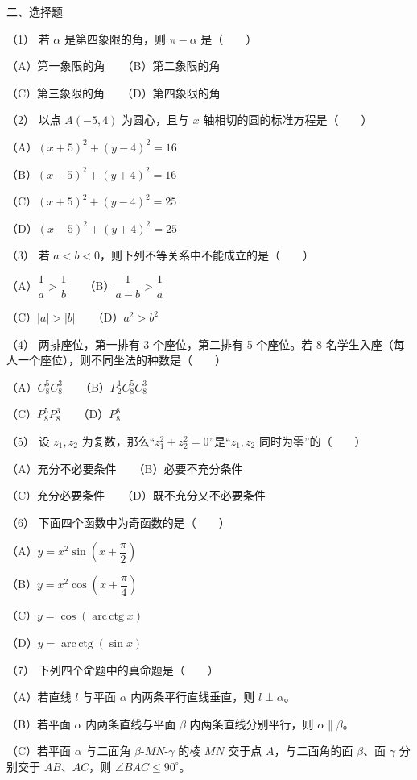\begin{question}

二、选择题

（1） 若 $\alpha$ 是第四象限的角，则 $\pi-\alpha$ 是\mbox{（　　）}

（A）第一象限的角　　（B）第二象限的角

（C）第三象限的角　　（D）第四象限的角

（2） 以点 $A(-5,4)$ 为圆心，且与 $x$ 轴相切的圆的标准方程是\mbox{（　　）}

（A）$(x+5)^2+(y-4)^2=16$

（B）$(x-5)^2+(y+4)^2=16$

（C）$(x+5)^2+(y-4)^2=25$

（D）$(x-5)^2+(y+4)^2=25$

（3） 若 $a<b<0$，则下列不等关系中不能成立的是\mbox{（　　）}

（A）$\dfrac1a>\dfrac1b$　　（B）$\dfrac1{a-b}>\dfrac1a$

（C）$|a|>|b|$　　（D）$a^2>b^2$

（4） 两排座位，第一排有 3 个座位，第二排有 5 个座位。若 8 名学生入座（每人一个座位），则不同坐法的种数是\mbox{（　　）}

（A）$C_8^5C_8^3$　　（B）$P_2^1C_8^5C_8^3$

（C）$P_8^5P_8^3$　　（D）$P_8^8$

（5） 设 $z_1,z_2$ 为复数，那么“$z_1^2+z_2^2=0$”是“$z_1,z_2$ 同时为零”的\mbox{（　　）}

（A）充分不必要条件　　（B）必要不充分条件

（C）充分必要条件　　（D）既不充分又不必要条件

（6） 下面四个函数中为奇函数的是\mbox{（　　）}

（A）$y=x^2\sin\left(x+\dfrac\pi2\right)$

（B）$y=x^2\cos\left(x+\dfrac\pi4\right)$

（C）$y=\cos(\operatorname{arc\,ctg}x)$

（D）$y=\operatorname{arc\,ctg}(\sin x)$

（7） 下列四个命题中的真命题是\mbox{（　　）}

（A）若直线 $l$ 与平面 $\alpha$ 内两条平行直线垂直，则 $l\perp\alpha$。

（B）若平面 $\alpha$ 内两条直线与平面 $\beta$ 内两条直线分别平行，则 $\alpha\parallel\beta$。

（C）若平面 $\alpha$ 与二面角 $\beta$-$MN$-$\gamma$ 的棱 $MN$ 交于点 $A$，与二面角的面 $\beta$、面 $\gamma$ 分别交于 $AB$、$AC$，则 $\angle BAC\le90^\circ$。


\end{question}
